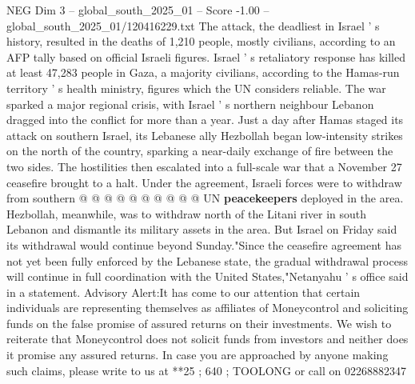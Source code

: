 \begin{textsample}{NEG Dim 3 – global\_south\_2025\_01 – Score -1.00 – global\_south\_2025\_01/120416229.txt}
The attack, the deadliest in Israel ' s history, resulted in the deaths of 1,210 people, mostly civilians, according to an AFP tally based on official Israeli figures.
Israel ' s retaliatory response has killed at least 47,283 people in Gaza, a majority civilians, according to the Hamas-run territory ' s health ministry, figures which the UN considers reliable.
The war sparked a major regional crisis, with Israel ' s northern neighbour Lebanon dragged into the conflict for more than a year.
Just a day after Hamas staged its attack on southern Israel, its Lebanese ally Hezbollah began low-intensity strikes on the north of the country, sparking a near-daily exchange of fire between the two sides.
The hostilities then escalated into a full-scale war that a November 27 ceasefire brought to a halt.
Under the agreement, Israeli forces were to withdraw from southern @ @ @ @ @ @ @ @ @ @ UN \textbf{peacekeepers} deployed in the area.
Hezbollah, meanwhile, was to withdraw north of the Litani river in south Lebanon and dismantle its military assets in the area.
But Israel on Friday said its withdrawal would continue beyond Sunday."Since the ceasefire agreement has not yet been fully enforced by the Lebanese state, the gradual withdrawal process will continue in full coordination with the United States,"Netanyahu ' s office said in a statement.
Advisory Alert:It has come to our attention that certain individuals are representing themselves as affiliates of Moneycontrol and soliciting funds on the false promise of assured returns on their investments.
We wish to reiterate that Moneycontrol does not solicit funds from investors and neither does it promise any assured returns.
In case you are approached by anyone making such claims, please write to us at **25 ; 640 ; TOOLONG or call on 02268882347

\end{textsample}

